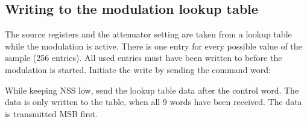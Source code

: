 \documentclass{article}
\newcommand{\bitrect}[2]{
  \begin{pgfonlayer}{foreground}
    \draw [thick] (0,0) rectangle (#1,1);
    \pgfmathsetmacro\result{#1-1}
    \foreach \x in {1,...,\result}
      \draw [thick] (\x,1) -- (\x, 0.8);
  \end{pgfonlayer}
  \bitlabels{#1}{#2}
}
\newcommand{\rwbits}[3]{
  \draw [thick] (#1,0) rectangle ++(#2,1) node[pos=0.5]{#3};
  \pgfmathsetmacro\start{#1+0.5}
  \pgfmathsetmacro\finish{#1+#2-0.5}
}
\newcommand{\robits}[3]{
  \begin{pgfonlayer}{background}
    \draw [thick, fill=lightgray] (#1,0) rectangle ++(#2,1) node[pos=0.5]{#3};
  \end{pgfonlayer}
  \pgfmathsetmacro\start{#1+0.5}
  \pgfmathsetmacro\finish{#1+#2-0.5}
}
\newcommand{\bitlabels}[2]{
  \foreach \bit in {1,...,#1}{
     \pgfmathsetmacro\result{#2}
     \node [above] at (\bit-0.5, 1) {\pgfmathprintnumber{\result}};
   }
}
\begin{document}
\subsection{Writing to the modulation lookup table}
The source registers and the attenuator setting are taken from a lookup table while the modulation is active. There is one entry for every possible value of the sample (256 entries). All used entries must have been written to before the modulation is started.
Initiate the write by sending the command word:
\begin{center}
\end{center}
While keeping NSS low, send the lookup table data after the control word. The data is only written to the table, when all 9 words have been received. The data is transmitted MSB first.
\begin{center}
\end{center}
\end{document}
